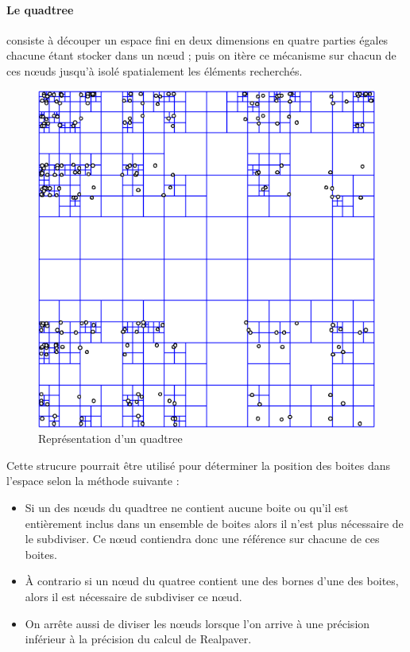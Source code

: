 \documentclass[11pt,a4paper,utf8x]{report}
\begin{document}
\paragraph{Le quadtree}consiste à découper un espace fini en deux dimensions en quatre parties égales chacune étant stocker dans un nœud ; puis on itère ce mécanisme sur chacun de ces nœuds jusqu'à isolé spatialement les éléments recherchés.
\begin{figure}[htbp]
\centering
\includegraphics[scale=0.50]{quadtree}
\caption{Représentation d'un quadtree}
\end{figure}
Cette strucure pourrait être utilisé pour déterminer la position des boites dans l'espace selon la méthode suivante :
\begin{itemize}
\item Si un des nœuds du quadtree ne contient aucune boite ou qu'il est entièrement inclus dans un ensemble de boites alors il n'est plus nécessaire de le subdiviser. Ce nœud contiendra donc une référence sur chacune de ces boites.
\item \`A contrario si un nœud du quatree contient une des bornes d'une des boites, alors il est nécessaire de subdiviser ce nœud.
\item On arrête aussi de diviser les nœuds lorsque l'on arrive à une précision inférieur à la précision du calcul de Realpaver.
\end{itemize}
\end{document}
